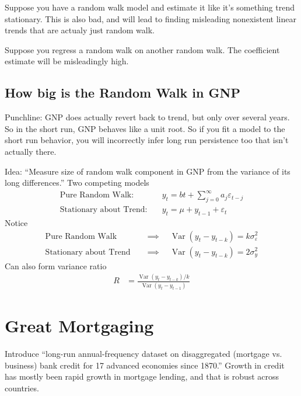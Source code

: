 \documentclass[12pt]{article}
\theoremstyle{plain}
\theoremstyle{definition}
\theoremstyle{remark}
\newcommand{\Var}{\operatorname{Var}}
\begin{document}
Suppose you have a random walk model and estimate it like it's something
trend stationary. This is also bad, and will lead to finding misleading
nonexistent linear trends that are actualy just random walk.

Suppose you regress a random walk on another random walk. The
coefficient estimate will be misleadingly high.



\clearpage
\subsection{How big is the Random Walk in GNP}

Punchline: GNP does actually revert back to trend, but only over several
years. So in the short run, GNP behaves like a unit root.
So if you fit a model to the short run behavior, you will incorrectly
infer long run persistence too that isn't actually there.

Idea: ``Measure size of random walk component in GNP from the variance
of its long differences.''
Two competing models
\begin{align*}
  \text{Pure Random Walk:}&\quad
  y_t
  = bt + \sum_{j=0}^\infty a_j \varepsilon_{t-j}
  \\
  \text{Stationary about Trend:}&\quad
  y_t
  = \mu + y_{t-1} + \varepsilon_t
\end{align*}
Notice
\begin{align*}
  \text{Pure Random Walk}
  \quad&\implies\quad
  \Var(y_t-y_{t-k})
  = k\sigma^2_\varepsilon
  \\
  \text{Stationary about Trend}
  \quad&\implies\quad
  \Var(y_t-y_{t-k})
  = 2\sigma^2_y
\end{align*}
Can also form variance ratio
\begin{align*}
  R
  &= \frac{\Var(y_t-y_{t-k})/k}{\Var(y_t-y_{t-1})}
\end{align*}


\clearpage
\section{Great Mortgaging}

Introduce ``long-run annual-frequency dataset on disaggregated
(mortgage vs. business) bank credit for 17 advanced economies since
1870.''
Growth in credit has mostly been rapid growth in mortgage lending, and
that is robust across countries.
\end{document}
